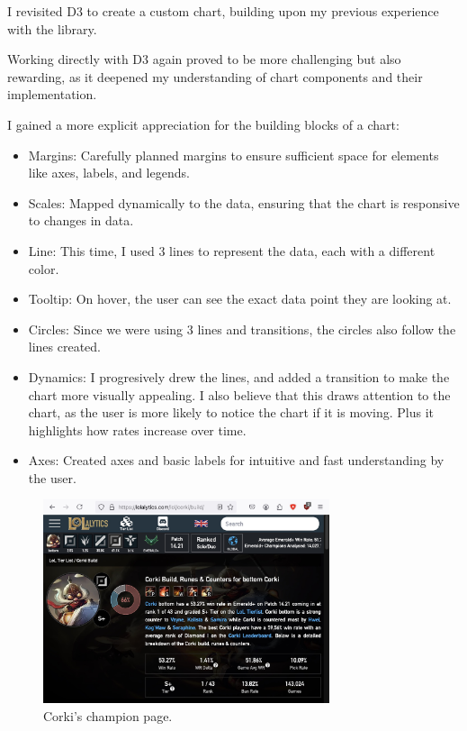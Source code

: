 \documentclass{article}
\begin{document}
I revisited D3 to create a custom chart, building upon my previous 
experience with the library. 

Working directly with D3 again proved to be more challenging 
but also rewarding, as it deepened my understanding of chart components 
and their implementation.

I gained a more explicit appreciation for the building blocks of a chart:

\begin{itemize}
  \item Margins: Carefully planned margins to ensure sufficient space for elements like axes, labels, and legends.
  \item Scales: Mapped dynamically to the data, ensuring that the chart is responsive to changes in data.
  \item Line: This time, I used 3 lines to represent the data, each with a different color.
  \item Tooltip: On hover, the user can see the exact data point they are looking at.
  \item Circles: Since we were using 3 lines and transitions, the circles also follow the lines created.
  \item Dynamics: I progresively drew the lines, and added a transition to make the chart more visually appealing. 
  I also believe that this draws attention to the chart, as the user is more likely to notice the chart if it is moving.
  Plus it highlights how rates increase over time.
  \item Axes: Created axes and basic labels for intuitive and fast understanding by the user.
\end{itemize}

\begin{figure}[ht] 
  \centering
  \includegraphics[width=0.75\textwidth]{figs/website.jpg}
  \caption{
      Corki's champion page.
  }
  \label{fig:fig1}
\end{figure}
\end{document}

